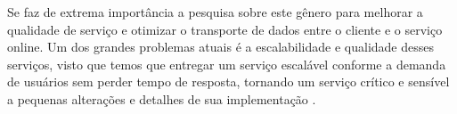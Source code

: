 Se faz de extrema importância a pesquisa sobre este gênero para melhorar a qualidade de serviço e otimizar o transporte de dados entre o cliente e o serviço online. Um dos grandes problemas atuais é a escalabilidade e qualidade desses serviços, visto que temos que entregar um serviço escalável conforme a demanda de usuários sem perder tempo de resposta, tornando um serviço crítico e sensível a pequenas alterações e detalhes de sua implementação \cite{cloud_fog}.
